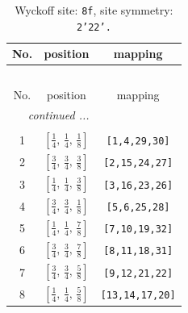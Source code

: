 \documentclass[fleqn,8pt]{jsarticle}
\begin{document}
\begin{longtable}{ccc}
\caption{Wyckoff site: {\tt 8f}, site symmetry: {\tt 2'22'.}}
 \\
 \hline \hline
No. & position & mapping \\ \hline \endfirsthead

\multicolumn{2}{l}{\tablename\ \thetable{}} \\
 \hline \hline
No. & position & mapping \\ \hline \endhead

 \hline \hline
\multicolumn{2}{r}{\footnotesize\it continued ...} \\ \endfoot

 \hline \hline
\multicolumn{2}{r}{} \\ \endlastfoot

1 & $\left[ \frac{1}{4},\, \frac{1}{4},\, \frac{1}{8} \right]$ & {\tt [1,4,29,30]} \\ \hline
2 & $\left[ \frac{3}{4},\, \frac{3}{4},\, \frac{3}{8} \right]$ & {\tt [2,15,24,27]} \\ \hline
3 & $\left[ \frac{1}{4},\, \frac{1}{4},\, \frac{3}{8} \right]$ & {\tt [3,16,23,26]} \\ \hline
4 & $\left[ \frac{3}{4},\, \frac{3}{4},\, \frac{1}{8} \right]$ & {\tt [5,6,25,28]} \\ \hline
5 & $\left[ \frac{1}{4},\, \frac{1}{4},\, \frac{7}{8} \right]$ & {\tt [7,10,19,32]} \\ \hline
6 & $\left[ \frac{3}{4},\, \frac{3}{4},\, \frac{7}{8} \right]$ & {\tt [8,11,18,31]} \\ \hline
7 & $\left[ \frac{3}{4},\, \frac{3}{4},\, \frac{5}{8} \right]$ & {\tt [9,12,21,22]} \\ \hline
8 & $\left[ \frac{1}{4},\, \frac{1}{4},\, \frac{5}{8} \right]$ & {\tt [13,14,17,20]} \\
\end{longtable}
\renewcommand{\arraystretch}{1.2}
\end{document}
